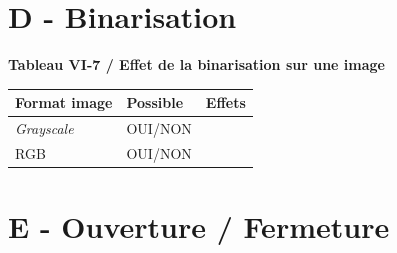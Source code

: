 \noindent
{} 

\noindent
\begin{minipage}{0.23\linewidth}
\end{minipage}
\hfill
\begin{minipage}{0.23\linewidth}
\end{minipage}
\hfill
\begin{minipage}{0.23\linewidth}
\hfill 
\end{minipage}
\hfill
\begin{minipage}{0.23\linewidth}
\hfill
\end{minipage}
\vspace{-0.3cm}

\section{D - Binarisation}
\vspace{-0.3cm}

\textbf{Tableau VI-7 / Effet de la binarisation sur une image}
\vspace{-0.3cm}

\begin{center}
\begin{tabular}{|>{\arraybackslash}p{3cm}|>{\centering\arraybackslash}p{3cm}|>{\centering\arraybackslash}p{10cm}|}
  \hline
  Format image & Possible & Effets \\
  \hline
  \textit{Grayscale} & OUI/NON & \rule{0pt}{2em} \\
  \hline
  RGB & OUI/NON & \rule{0pt}{1em} \\
  \hline
\end{tabular}
\end{center}

\noindent
{} 


\newpage

\section{E - Ouverture / Fermeture}
\vspace{-0.3cm}

